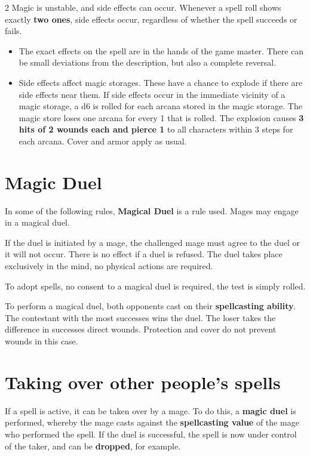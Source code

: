 \begin{multicols}{2}
Magic is unstable, and side effects can occur. Whenever a spell roll shows exactly \textbf{two ones}, side effects occur, regardless of whether the spell succeeds or fails.
\begin{itemize}
    \item The exact effects on the spell are in the hands of the game master. There can be small deviations from the description, but also a complete reversal.
    \item Side effects affect magic storages. These have a chance to explode if there are side effects near them. If side effects occur in the immediate vicinity of a magic storage, a d6 is rolled for each arcana stored in the magic storage. The magic store loses one arcana for every 1 that is rolled. The explosion causes \textbf{3 hits of 2 wounds each and pierce 1} to all characters within 3 steps for each arcana. Cover and armor apply as usual.
\end{itemize}

\section{Magic Duel}

In some of the following rules, \textbf{Magical Duel} is a rule used. Mages may engage in a magical duel.

If the duel is initiated by a mage, the challenged mage must agree to the duel or it will not occur. There is no effect if a duel is refused. The duel takes place exclusively in the mind, no physical actions are required.

To adopt spells, no consent to a magical duel is required, the test is simply rolled.

To perform a magical duel, both opponents cast on their \textbf{spellcasting ability}. The contestant with the most successes wins the duel. The loser takes the difference in successes direct wounds. Protection and cover do not prevent wounds in this case.

\section{Taking over other people's spells}

If a spell is active, it can be taken over by a mage. To do this, a \textbf{magic duel} is performed, whereby the mage casts against the \textbf{spellcasting value} of the mage who performed the spell. If the duel is successful, the spell is now under control of the taker, and can be \textbf{dropped}, for example.


\end{multicols}
